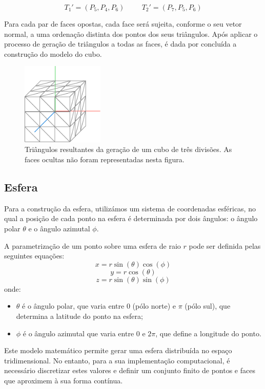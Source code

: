\documentclass[12pt, a4paper]{article}
\begin{document}
$$
T_1' = (P_5, P_4, P_6)
\hspace{1cm}
T_2' = (P_7, P_5, P_6)
$$

Para cada par de faces opostas, cada face será sujeita, conforme o seu vetor normal, a uma ordenação
distinta dos pontos dos seus triângulos. Após aplicar o processo de geração de triângulos a todas as
faces, é dada por concluída a construção do modelo do cubo.

\begin{figure}[H]
    \centering
    \includegraphics[width=0.35\textwidth]{res/figures/CubeTriangles.pdf}
    \caption{
        \onehalfspacing
        Triângulos resultantes da geração de um cubo de três divisões. As faces ocultas não foram
        representadas nesta figura.
    }
\end{figure}

\subsection{Esfera}

Para a construção da esfera, utilizámos um sistema de coordenadas esféricas,
no qual a posição de cada ponto na esfera é determinada por dois ângulos: o
ângulo polar \( \theta \) e o ângulo azimutal \( \phi \).

A parametrização de um ponto sobre uma esfera de raio \( r \) pode ser definida pelas seguintes
equações:
\[
x = r \sin(\theta) \cos(\phi)
\]
\[
y = r \cos(\theta)
\]
\[
z = r \sin(\theta) \sin(\phi)
\]
onde:
\begin{itemize}
\item \( \theta \) é o ângulo polar, que varia entre \( 0 \) (pólo norte) e \( \pi \)
(pólo sul), que determina a latitude do ponto na esfera;
\item \( \phi \) é o ângulo azimutal que varia entre \( 0 \) e \( 2\pi \), que define a
longitude do ponto.
\end{itemize}

Este modelo matemático permite gerar uma esfera distribuída no espaço tridimensional.
No entanto, para a sua implementação computacional, é necessário discretizar estes valores e
definir um conjunto finito de pontos e faces que aproximem à sua forma contínua.
\end{document}
